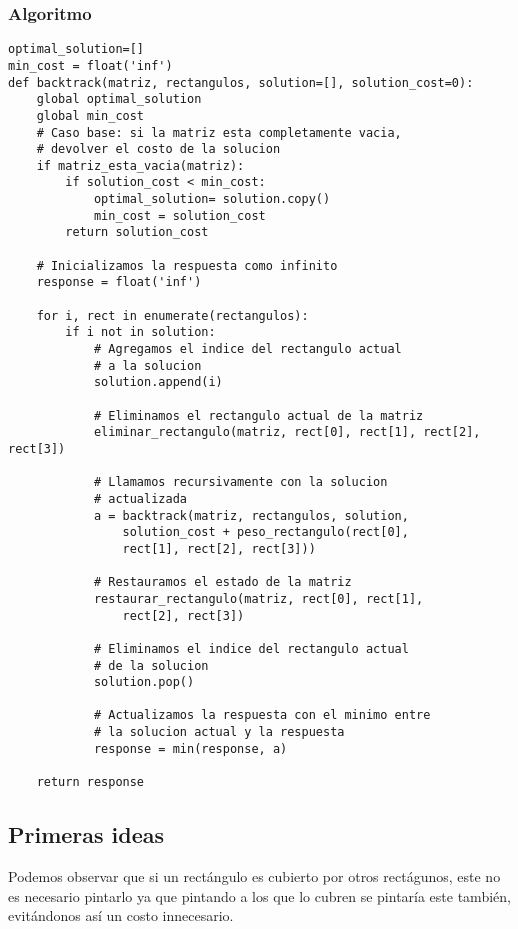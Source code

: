 \documentclass{article}
\begin{document}
	\subsubsection{Algoritmo}
	\begin{lstlisting}
optimal_solution=[]
min_cost = float('inf')
def backtrack(matriz, rectangulos, solution=[], solution_cost=0):
    global optimal_solution
    global min_cost
    # Caso base: si la matriz esta completamente vacia,
    # devolver el costo de la solucion
    if matriz_esta_vacia(matriz):
        if solution_cost < min_cost:
            optimal_solution= solution.copy()
            min_cost = solution_cost
        return solution_cost

    # Inicializamos la respuesta como infinito
    response = float('inf')
    
    for i, rect in enumerate(rectangulos):
        if i not in solution:
            # Agregamos el indice del rectangulo actual
            # a la solucion
            solution.append(i)
            
            # Eliminamos el rectangulo actual de la matriz
            eliminar_rectangulo(matriz, rect[0], rect[1], rect[2], rect[3])
            
            # Llamamos recursivamente con la solucion 
            # actualizada
            a = backtrack(matriz, rectangulos, solution, 
            	solution_cost + peso_rectangulo(rect[0], 
            	rect[1], rect[2], rect[3]))
            
            # Restauramos el estado de la matriz
            restaurar_rectangulo(matriz, rect[0], rect[1], 
            	rect[2], rect[3])
            
            # Eliminamos el indice del rectangulo actual 
            # de la solucion
            solution.pop()
            
            # Actualizamos la respuesta con el minimo entre 
            # la solucion actual y la respuesta
            response = min(response, a)
    
    return response
	\end{lstlisting}
	
	\subsection{Primeras ideas}
	Podemos observar que si un rectángulo es cubierto por otros rectágunos, este no es necesario pintarlo ya que pintando a los que lo cubren se pintaría este también, evitándonos así un costo innecesario.
\end{document}
